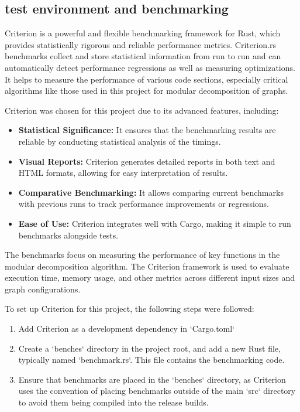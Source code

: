 \subsection{test environment and benchmarking}\label{subsec:test-environment-and-benchmarking}

Criterion\cite{criterion} is a powerful and flexible benchmarking framework for Rust, which provides statistically rigorous and reliable performance metrics.
Criterion.rs benchmarks collect and store statistical information from run to run and can automatically detect performance regressions as well as measuring optimizations.
It helps to measure the performance of various code sections, especially critical algorithms like those used in this project for modular decomposition of graphs.

Criterion was chosen for this project due to its advanced features, including:
\begin{itemize}
    \item \textbf{Statistical Significance:} It ensures that the benchmarking results are reliable by conducting statistical analysis of the timings.
    \item \textbf{Visual Reports:} Criterion generates detailed reports in both text and HTML formats, allowing for easy interpretation of results.
    \item \textbf{Comparative Benchmarking:} It allows comparing current benchmarks with previous runs to track performance improvements or regressions.
    \item \textbf{Ease of Use:} Criterion integrates well with Cargo, making it simple to run benchmarks alongside tests.
\end{itemize}

The benchmarks focus on measuring the performance of key functions in the modular decomposition algorithm.
The Criterion framework is used to evaluate execution time, memory usage, and other metrics across different input sizes and graph configurations.

To set up Criterion for this project, the following steps were followed:
\begin{enumerate}
    \item Add Criterion as a development dependency in `Cargo.toml`
    \item  Create a `benches` directory in the project root, and add a new Rust file, typically named `benchmark.rs`.
    This file contains the benchmarking code.
    \item Ensure that benchmarks are placed in the `benches` directory, as Criterion uses the convention of placing benchmarks outside of the main `src` directory to avoid them being compiled into the release builds.
\end{enumerate}

